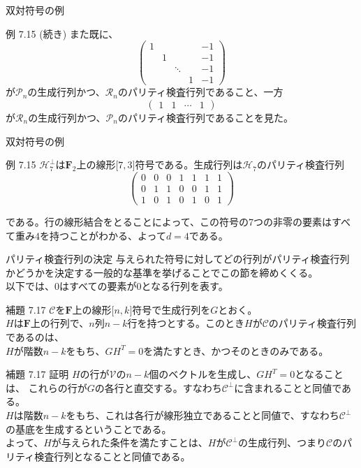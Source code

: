 \documentclass[dvipdfmx,10pt,jsarticle]{beamer}
\begin{document}
  \begin{frame}{双対符号の例}
    \begin{block}{例 7.15 (続き)}
      また既に、
      \[\begin{pmatrix}
          1 &   &   &  & -1 \\
            & 1 &   &  & -1 \\
            &   & \ddots &  & -1 \\
            &   &   & 1 & -1
      \end{pmatrix} \]
      が$\mathcal{P}_n$の生成行列かつ、$\mathcal{R}_n$のパリティ検査行列であること、一方
      \[\begin{pmatrix}
          1 & 1 & \cdots & 1
      \end{pmatrix} \]
      が$\mathcal{R}_n$の生成行列かつ、$\mathcal{P}_n$のパリティ検査行列であることを見た。
    \end{block}
  \end{frame}
  \begin{frame}{双対符号の例}
    \begin{block}{例 7.15}
      $\mathcal{H}_7^\perp$は$\mathbf{F}_2$上の線形$\lbrack7,3\rbrack$符号である。生成行列は$\mathcal{H}_7$のパリティ検査行列
      \[\begin{pmatrix}
          0 & 0 & 0 & 1 & 1 & 1 & 1 \\
          0 & 1 & 1 & 0 & 0 & 1 & 1 \\
          1 & 0 & 1 & 0 & 1 & 0 & 1 
        \end{pmatrix} \]
    \end{block}
    である。行の線形結合をとることによって、この符号の7つの非零の要素はすべて重み$4$を持つことがわかる、よって$d=4$である。
  \end{frame}

  \begin{frame}{パリティ検査行列の決定}
    与えられた符号に対してどの行列がパリティ検査行列かどうかを決定する一般的な基準を挙げることでこの節を締めくくる。\\
    以下では、$0$はすべての要素が$0$となる行列を表す。
    \begin{block}{補題 7.17}
      $\mathcal{C}$を$\mathbf{F}$上の線形$\lbrack n,k\rbrack$符号で生成行列を$G$とおく。\\
      $H$は$\mathbf{F}$上の行列で、$n$列$n-k$行を持つとする。このとき$H$が$\mathcal{C}$のパリティ検査行列であるのは、\\
      $H$が階数$n-k$をもち、$GH^T = 0$を満たすとき、かつそのときのみである。
    \end{block}
  \end{frame}
  \begin{frame}{補題 7.17 証明}
    $H$の行が$\mathcal{V}$の$n-k$個のベクトルを生成し、$GH^T = 0$となることは、
    これらの行が$G$の各行と直交する。すなわち$\mathcal{C}^\perp$に含まれることと同値である。\\
    $H$は階数$n-k$をもち、これは各行が線形独立であることと同値で、すなわち$\mathcal{C}^\perp$の基底を生成するということである。\\
    よって、$H$が与えられた条件を満たすことは、$H$が$\mathcal{C}^\perp$の生成行列、つまり$\mathcal{C}$のパリティ検査行列となることと同値である。
  \end{frame}
\end{document}
